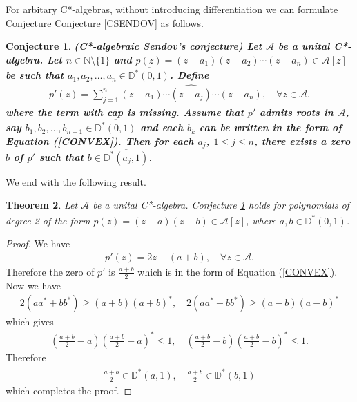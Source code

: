 \documentclass{amsart}
\newtheorem{theorem}{Theorem}[section]
\newtheorem{conjecture}[theorem]{Conjecture}
\begin{document}
For arbitary C*-algebras, without introducing differentiation we can formulate Conjecture Conjecture \ref{CSENDOV}   as follows. 
\begin{conjecture}\label{CSENDOV2} 
\textbf{(C*-algebraic Sendov's conjecture)
	Let $\mathcal{A}$	be a unital  C*-algebra. 	Let $n \in \mathbb{N}\setminus \{1\}$ and $p(z)=(z-a_1)(z-a_2)\cdots (z-a_n)\in\mathcal{A}[z]$ be such that $a_1, a_2, \dots,  a_n \in \overline{\mathbb{D^*}(0, 1)}$.  Define 
	\begin{align*}
		p'(z)=\sum_{j=1}^{n}(z-a_1)\cdots \widehat{(z-a_j)}\cdots (z-a_n), \quad \forall z \in \mathcal{A}.
	\end{align*}
	where the term with cap is missing. Assume that $p'$ admits roots in $\mathcal{A}$, say $b_1, b_2, \dots,  b_{n-1} \in \overline{\mathbb{D^*}(0, 1)}$ and each $b_k$ can be written in the form of Equation (\ref{CONVEX}). Then for each $a_j$, $1\leq j\leq n$, there exists  a zero $b$ of $p'$ such that $b \in  \overline{\mathbb{D}^*(a_j, 1)}$.} 	
\end{conjecture}
We end with the following result.
\begin{theorem}
Let $\mathcal{A}$	be a unital  C*-algebra. Conjecture \ref{CSENDOV2}   holds for polynomials  of degree 2 of the form $p(z)=(z-a)(z-b)\in \mathcal{A}[z]$, where $a, b \in \overline{\mathbb{D}^*(0,1)}$. 
\end{theorem}
\begin{proof}
We have 
\begin{align*}
	p'(z)=2z-(a+b), \quad \forall z \in \mathcal{A}.
\end{align*}
Therefore the zero of $p'$ is $\frac{a+b}{2}$ which is in the form of Equation (\ref{CONVEX}). Now we have
\begin{align*}
	2(aa^*+bb^*)\geq (a+b)(a+b)^*, \quad 2(aa^*+bb^*)\geq (a-b)(a-b)^* 
\end{align*}
which gives
\begin{align*}
\left(\frac{a+b}{2}-a\right)\left(\frac{a+b}{2}-a\right)^*\leq 1, \quad \left(\frac{a+b}{2}-b\right)\left(\frac{a+b}{2}-b\right)^*\leq 1.	
\end{align*}
Therefore 
\begin{align*}
\frac{a+b}{2}\in \overline{\mathbb{D}^*\left(a, 1\right)}, \quad \frac{a+b}{2}\in \overline{\mathbb{D}^*(b, 1)}	
\end{align*}
which completes the proof. 
\end{proof}






 
  
  
  
  
  
  
  
 
 
 
\end{document}
